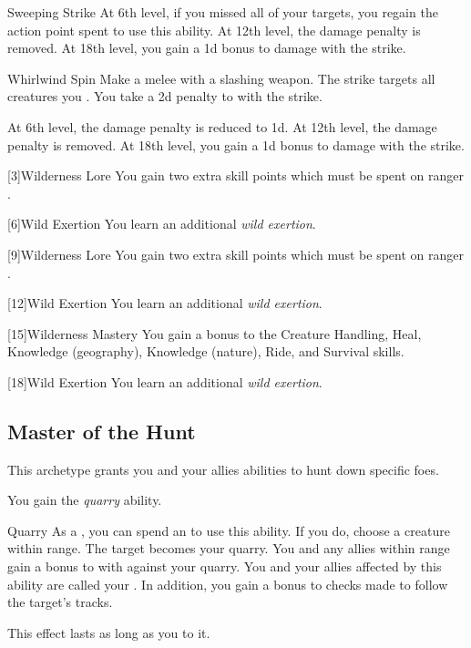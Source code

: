 {\begin{ability}{Sweeping Strike}
                At 6th level, if you missed all of your targets, you regain the action point spent to use this ability.
                At 12th level, the damage penalty is removed.
                At 18th level, you gain a \plus1d bonus to damage with the strike.
            \end{ability}

            \begin{ability}{Whirlwind Spin}
                Make a melee  with a slashing weapon.
                The strike targets all creatures you .
                You take a \minus2d penalty to  with the strike.

                At 6th level, the damage penalty is reduced to \minus1d.
                At 12th level, the damage penalty is removed.
                At 18th level, you gain a \plus1d bonus to damage with the strike.
            \end{ability}
        }

        [3]{Wilderness Lore} You gain two extra skill points which must be spent on ranger .

        [6]{Wild Exertion}
        You learn an additional \textit{wild exertion}.

        [9]{Wilderness Lore} You gain two extra skill points which must be spent on ranger .

        [12]{Wild Exertion} 
        You learn an additional \textit{wild exertion}.

        [15]{Wilderness Mastery} You gain a  bonus to the Creature Handling, Heal, Knowledge (geography), Knowledge (nature), Ride, and Survival skills.

        [18]{Wild Exertion} 
        You learn an additional \textit{wild exertion}.

    \subsection{Master of the Hunt}
        This archetype grants you and your allies abilities to hunt down specific foes.

        \label{Quarry} You gain the \textit{quarry} ability.
        \begin{ability}{Quarry}
            As a , you can spend an  to use this ability.
            If you do, choose a creature within \rnglong range.
            The target becomes your quarry.
            You and any allies within range gain a  bonus to  with  against your quarry.
            You and your allies affected by this ability are called your .
            In addition, you gain a  bonus to checks made to follow the target's tracks.

            This effect lasts as long as you  to it.
        \end{ability}

